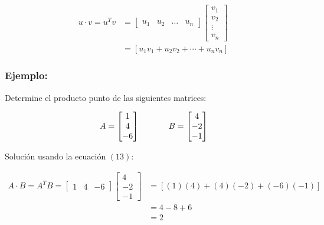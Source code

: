 \documentclass{article}
\begin{document}
    \begin{equation}
        \begin{aligned}
            u \cdot v=u^{T} v &= \left[\begin{array}{llll}
            u_{1} & u_{2} & \ldots & u_{n}
            \end{array}\right]\left[\begin{array}{c}
            v_{1} \\
            v_{2} \\
            \vdots \\
            v_{n}
            \end{array}\right] \\ &= \left[u_{1} v_{1}+u_{2} v_{2}+\cdots+u_{n} v_{n}\right]
        \end{aligned}
    \end{equation}

    \subsubsection*{Ejemplo:}

    Determine el producto punto de las siguientes matrices:

    \begin{gather*}
        A = \begin{bmatrix}
            1  \\
            4  \\
            -6
        \end{bmatrix} \hspace{35 pt}
        B = \begin{bmatrix}
            4  \\
            -2 \\
            -1
        \end{bmatrix}
    \end{gather*}

    Solución usando la ecuación $(13)$:

    \begin{equation*}
        \begin{aligned}
            A \cdot B = A^TB = \begin{bmatrix}
                1 & 4 & -6
            \end{bmatrix} \begin{bmatrix}
                4 \\
                -2 \\
                -1
            \end{bmatrix}
            &=[(1)(4) + (4)(-2) + (-6)(-1)] \\
            &=4-8+6 \\
            &=2
        \end{aligned}
    \end{equation*}
\end{document}
